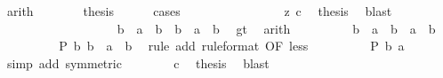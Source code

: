 \begin{isabellebody}
\ arith\isanewline
\ \ \ \ \isamarkupfalse%
\ \isamarkupfalse%
\ {\isacharquery}{\kern0pt}thesis\isanewline
\ \ \ \ \isamarkupfalse%
\ cases\isanewline
\ \ \ \ \ \ \isamarkupfalse%
\ {}\isanewline
\ \ \ \ \ \ \isamarkupfalse%
\ z\ c\ \isamarkupfalse%
\ {\isacharquery}{\kern0pt}thesis\ \isamarkupfalse%
\ blast\isanewline
\ \ \ \ \isamarkupfalse%
\isanewline
\ \ \ \ \ \ \isamarkupfalse%
\ {}\isanewline
\ \ \ \ \ \ \isamarkupfalse%
\ \isamarkupfalse%
\ {\isacharasterisk}{\kern0pt}{\isacharcolon}{\kern0pt}\ {\isachardoublequoteopen}b\ {\isacharplus}{\kern0pt}\ a\ {\isacharminus}{\kern0pt}\ b\ {\isacharequal}{\kern0pt}\ b\ {\isacharplus}{\kern0pt}\ {\isacharparenleft}{\kern0pt}a\ {\isacharminus}{\kern0pt}\ b{\isacharparenright}{\kern0pt}{\isachardoublequoteclose}\ \isamarkupfalse%
\ gt\ \isamarkupfalse%
\ arith\isanewline
\ \ \ \ \ \ \isamarkupfalse%
\ \isamarkupfalse%
\ {\isachardoublequoteopen}b\ {\isacharplus}{\kern0pt}\ {\isacharparenleft}{\kern0pt}a\ {\isacharminus}{\kern0pt}\ b{\isacharparenright}{\kern0pt}\ {\isacharless}{\kern0pt}\ a\ {\isacharplus}{\kern0pt}\ b{\isachardoublequoteclose}\ \isacommand{{\isachardot}{\kern0pt}}\isamarkupfalse%
\isanewline
\ \ \ \ \ \ \isamarkupfalse%
\ \isamarkupfalse%
\ {\isachardoublequoteopen}P\ b\ {\isacharparenleft}{\kern0pt}b\ {\isacharplus}{\kern0pt}\ {\isacharparenleft}{\kern0pt}a\ {\isacharminus}{\kern0pt}\ b{\isacharparenright}{\kern0pt}{\isacharparenright}{\kern0pt}{\isachardoublequoteclose}\ \isamarkupfalse%
\ {\isacharparenleft}{\kern0pt}rule\ add\ {\isacharbrackleft}{\kern0pt}rule{\isacharunderscore}{\kern0pt}format{\isacharcomma}{\kern0pt}\ OF\ less{\isacharbrackright}{\kern0pt}{\isacharparenright}{\kern0pt}\isanewline
\ \ \ \ \ \ \isamarkupfalse%
\ \isamarkupfalse%
\ {\isachardoublequoteopen}P\ b\ a{\isachardoublequoteclose}\ \isamarkupfalse%
\ {\isacharparenleft}{\kern0pt}simp\ add{\isacharcolon}{\kern0pt}\ {\isacharasterisk}{\kern0pt}{\isacharbrackleft}{\kern0pt}symmetric{\isacharbrackright}{\kern0pt}{\isacharparenright}{\kern0pt}\isanewline
\ \ \ \ \ \ \isamarkupfalse%
\ c\ \isamarkupfalse%
\ {\isacharquery}{\kern0pt}thesis\ \isamarkupfalse%
\ blast\isanewline
\ \ \ \ \isamarkupfalse%

\end{isabellebody}
